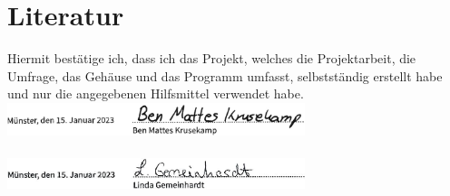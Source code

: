 \documentclass[10pt]{article}
\begin{document}
\section{Literatur}
\begingroup
\renewcommand{\section}[2]{}
\printbibliography
\endgroup
\newpage\section*{\bfseries Selbstständigkeitserklärung}
\vspace{3ex}
Hiermit bestätige ich, dass ich das Projekt, welches die Projektarbeit, die Umfrage, das Gehäuse und das Programm umfasst, selbstständig erstellt habe und nur die angegebenen Hilfsmittel verwendet habe.\\
\includegraphics[width=0.65\textwidth]{selbstständigkeitserklärung/BMK-Selbstjpg.jpg}\mbox{}\\\\
\includegraphics[width=0.65\textwidth]{selbstständigkeitserklärung/Linda-Selbst.jpg}
\end{document}
